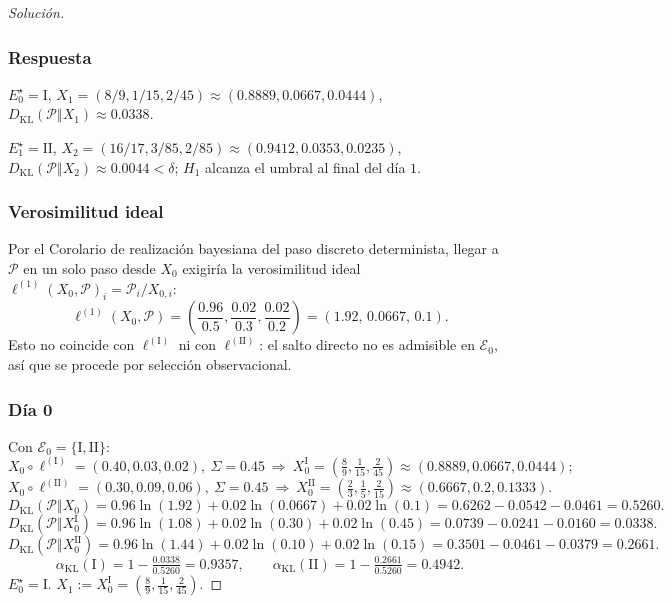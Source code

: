 ﻿\documentclass[12pt]{article}
\begin{document}
\begin{proof}[Solución]
\subsubsection*{Respuesta}
$E_0^\star=\mathrm I$, $X_1=(8/9,1/15,2/45)\approx(0.8889,0.0667,0.0444)$, $D_{\mathrm{KL}}(\mathcal P\Vert X_1)\approx0.0338$.

$E_1^\star=\mathrm{II}$, $X_2=(16/17,3/85,2/85)\approx(0.9412,0.0353,0.0235)$, $D_{\mathrm{KL}}(\mathcal P\Vert X_2)\approx0.0044<\delta$; $H_1$ alcanza el umbral al final del día $1$.

\subsubsection*{Verosimilitud ideal}
Por el Corolario de realización bayesiana del paso discreto determinista, llegar a $\mathcal P$ en un solo paso desde $X_0$ exigiría la verosimilitud ideal $\ell^{(1)}(X_0,\mathcal P)_i=\mathcal P_i/X_{0,i}$:
\[
\ell^{(1)}(X_0,\mathcal P)=\left(\frac{0.96}{0.5},\frac{0.02}{0.3},\frac{0.02}{0.2}\right)=(1.92,\,0.0667,\,0.1).
\]
Esto no coincide con $\ell^{(\mathrm I)}$ ni con $\ell^{(\mathrm{II})}$: el salto directo no es admisible en $\mathcal E_0$, así que se procede por selección observacional.

\subsubsection*{Día 0}
Con $\mathcal E_0=\{\mathrm I,\mathrm{II}\}$:
\[
X_0\circ\ell^{(\mathrm I)}=(0.40,0.03,0.02),\ \Sigma=0.45
\ \Rightarrow\
X_0^{\mathrm I}=\left(\tfrac{8}{9},\tfrac{1}{15},\tfrac{2}{45}\right)\approx(0.8889,0.0667,0.0444);
\]
\[
X_0\circ\ell^{(\mathrm{II})}=(0.30,0.09,0.06),\ \Sigma=0.45
\ \Rightarrow\
X_0^{\mathrm{II}}=\left(\tfrac{2}{3},\tfrac{1}{5},\tfrac{2}{15}\right)\approx(0.6667,0.2,0.1333).
\]
\[
D_{\mathrm{KL}}(\mathcal P\Vert X_0)=0.96\ln(1.92)+0.02\ln(0.0667)+0.02\ln(0.1)=0.6262-0.0542-0.0461=0.5260.
\]
\[
D_{\mathrm{KL}}(\mathcal P\Vert X_0^{\mathrm I})=0.96\ln(1.08)+0.02\ln(0.30)+0.02\ln(0.45)=0.0739-0.0241-0.0160=0.0338.
\]
\[
D_{\mathrm{KL}}(\mathcal P\Vert X_0^{\mathrm{II}})=0.96\ln(1.44)+0.02\ln(0.10)+0.02\ln(0.15)=0.3501-0.0461-0.0379=0.2661.
\]
\[
\alpha_{\mathrm{KL}}(\mathrm I)=1-\tfrac{0.0338}{0.5260}=0.9357,\qquad
\alpha_{\mathrm{KL}}(\mathrm{II})=1-\tfrac{0.2661}{0.5260}=0.4942.
\]
$E_0^\star=\mathrm I$. $X_1:=X_0^{\mathrm I}=\left(\tfrac{8}{9},\tfrac{1}{15},\tfrac{2}{45}\right)$.


\end{proof}
\end{document}
